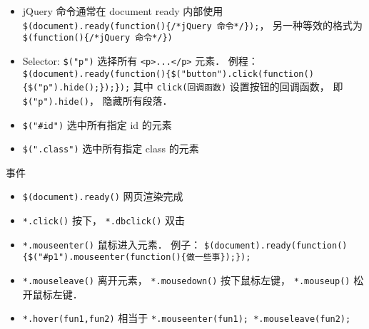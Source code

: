 

\begin{itemize}
\item jQuery 命令通常在 document ready 内部使用 \verb|$(document).ready(function(){/*jQuery 命令*/});|， 另一种等效的格式为 \verb|$(function(){/*jQuery 命令*/})|
\item Selector: \verb|$("p")| 选择所有 \verb|<p>...</p>| 元素． 例程： \verb|$(document).ready(function(){$("button").click(function(){$("p").hide();});});| 其中 \verb|click(回调函数)| 设置按钮的回调函数， 即 \verb|$("p").hide()|， 隐藏所有段落．
\item \verb|$("#id")| 选中所有指定 id 的元素
\item \verb|$(".class")| 选中所有指定 class 的元素
\end{itemize}

事件
\begin{itemize}
\item \verb|$(document).ready()| 网页渲染完成
\item \verb|*.click()| 按下， \verb|*.dbclick()| 双击
\item \verb|*.mouseenter()| 鼠标进入元素． 例子： \verb|$(document).ready(function(){$("#p1").mouseenter(function(){做一些事});});|
\item \verb|*.mouseleave()| 离开元素， \verb|*.mousedown()| 按下鼠标左键， \verb|*.mouseup()| 松开鼠标左键．
\item \verb|*.hover(fun1,fun2)| 相当于 \verb|*.mouseenter(fun1); *.mouseleave(fun2);|
\end{itemize}
